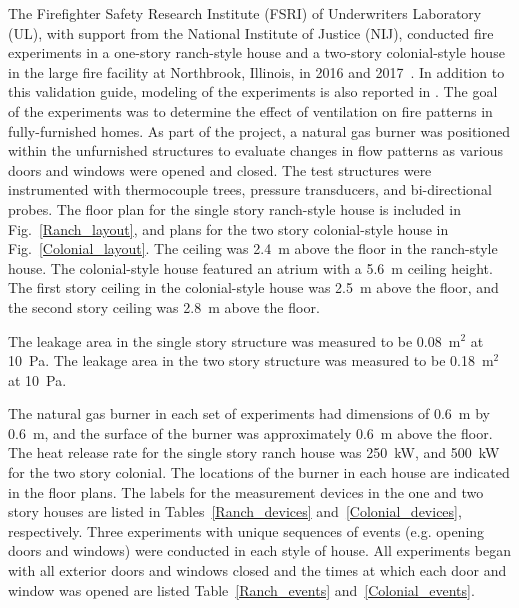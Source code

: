 The Firefighter Safety Research Institute (FSRI) of Underwriters Laboratory (UL), with support from the National Institute of Justice (NIJ), conducted fire experiments in a one-story ranch-style house and a two-story colonial-style house in the large fire facility at Northbrook, Illinois, in 2016 and 2017~\cite{Madrzykowski:2019}. In addition to this validation guide, modeling of the experiments is also reported in \cite{McKinnon:FISJ2021}.  The goal of the experiments was to determine the effect of ventilation on fire patterns in fully-furnished homes. As part of the project, a natural gas burner was positioned within the unfurnished structures to evaluate changes in flow patterns as various doors and windows were opened and closed. The test structures were instrumented with thermocouple trees, pressure transducers, and bi-directional probes. The floor plan for the single story ranch-style house is included in Fig.~\ref{Ranch_layout}, and plans for the two story colonial-style house in Fig.~\ref{Colonial_layout}. The ceiling was 2.4~m above the floor in the ranch-style house. The colonial-style house featured an atrium with a 5.6~m ceiling height. The first story ceiling in the colonial-style house was 2.5~m above the floor, and the second story ceiling was 2.8~m above the floor.

The leakage area in the single story structure was measured to be 0.08~m$^2$ at 10~Pa. The leakage area in the two story structure was measured to be 0.18~m$^2$ at 10~Pa.

The natural gas burner in each set of experiments had dimensions of 0.6~m by 0.6~m, and the surface of the burner was approximately 0.6~m above the floor. The heat release rate for the single story ranch house was 250~kW, and 500~kW for the two story colonial. The locations of the burner in each house are indicated in the floor plans. The labels for the measurement devices in the one and two story houses are listed in Tables~\ref{Ranch_devices} and~\ref{Colonial_devices}, respectively. Three experiments with unique sequences of events (e.g. opening doors and windows) were conducted in each style of house. All experiments began with all exterior doors and windows closed and the times at which each door and window was opened are listed Table~\ref{Ranch_events} and~\ref{Colonial_events}.


